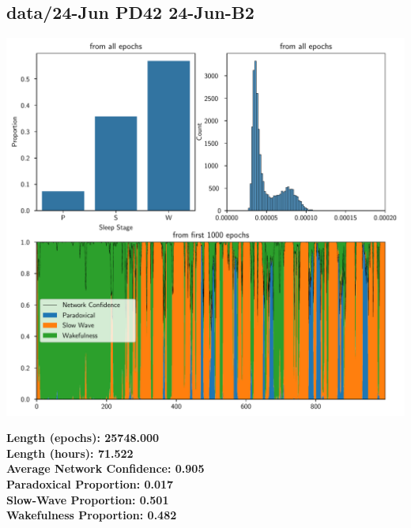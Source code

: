         \subsection*{ data/24-Jun PD42 24-Jun-B2 }
        \begin{center}
        \begin{adjustbox}{width=1\textwidth}
        \includegraphics[page=28]{figs.pdf}
        \end{adjustbox}
        \end{center}
        \large\textbf{Length (epochs): 25748.000}\\
        \textbf{Length (hours): 71.522}\\
        \textbf{Average Network Confidence: 0.905}\\
        \textbf{Paradoxical Proportion: 0.017}\\
        \textbf{Slow-Wave Proportion: 0.501}\\
        \textbf{Wakefulness Proportion: 0.482}\\
        
